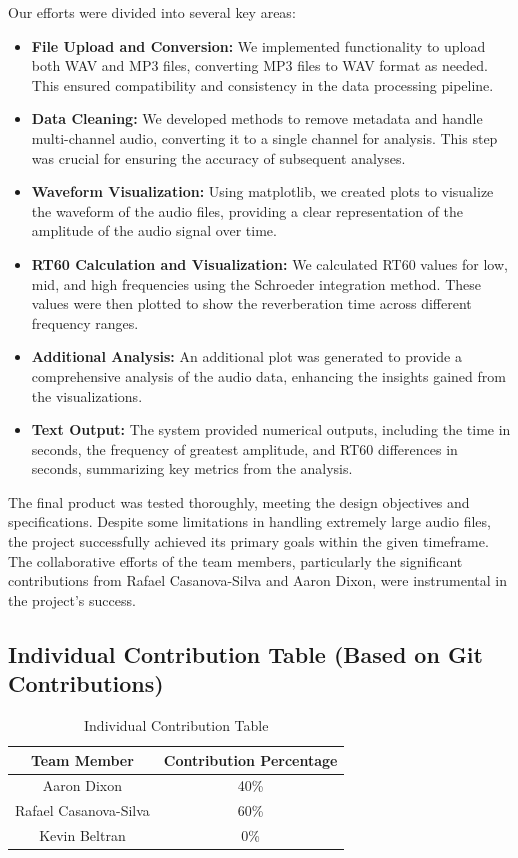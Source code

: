 \documentclass[11pt]{article}
\begin{document}
Our efforts were divided into several key areas:

\begin{itemize}
    \item \textbf{File Upload and Conversion:} We implemented functionality to upload both WAV and MP3 files, converting MP3 files to WAV format as needed. This ensured compatibility and consistency in the data processing pipeline.
    \item \textbf{Data Cleaning:} We developed methods to remove metadata and handle multi-channel audio, converting it to a single channel for analysis. This step was crucial for ensuring the accuracy of subsequent analyses.
    \item \textbf{Waveform Visualization:} Using matplotlib, we created plots to visualize the waveform of the audio files, providing a clear representation of the amplitude of the audio signal over time.
    \item \textbf{RT60 Calculation and Visualization:} We calculated RT60 values for low, mid, and high frequencies using the Schroeder integration method. These values were then plotted to show the reverberation time across different frequency ranges.
    \item \textbf{Additional Analysis:} An additional plot was generated to provide a comprehensive analysis of the audio data, enhancing the insights gained from the visualizations.
    \item \textbf{Text Output:} The system provided numerical outputs, including the time in seconds, the frequency of greatest amplitude, and RT60 differences in seconds, summarizing key metrics from the analysis.
\end{itemize}

The final product was tested thoroughly, meeting the design 
objectives and specifications. Despite some limitations in handling
extremely large audio files, the project successfully achieved its 
primary goals within the given timeframe. 
The collaborative efforts of the team members, particularly the 
significant contributions from Rafael Casanova-Silva and Aaron Dixon, 
were instrumental in the project's success.

\subsection{Individual Contribution Table (Based on Git Contributions)}
\begin{table}[h!]
\centering
\caption{Individual Contribution Table}
\begin{tabular}{|c|c|}
\hline
\textbf{Team Member} & \textbf{Contribution Percentage} \\
\hline
Aaron Dixon & 40\% \\
\hline
Rafael Casanova-Silva & 60\% \\
\hline
Kevin Beltran & 0\% \\
\hline
\end{tabular}
\end{table}
\end{document}
